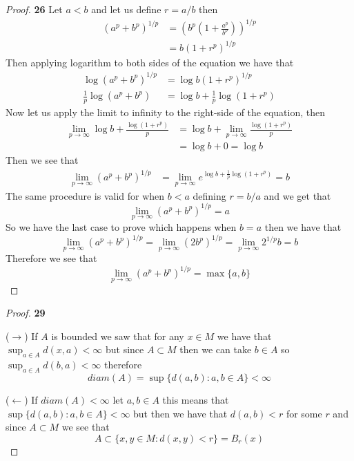 \documentclass[11pt]{article}
\theoremstyle{definition}
\begin{document}
    \begin{proof}{\textbf{26}}
        Let $a<b$ and let us define $r = a/b$ then
        \begin{align*}
            (a^p + b^p)^{1/p} &= \left(b^{p}(1 + \frac{a^p}{b^p})\right)^{1/p}\\
                &= b(1 + r^p)^{1/p}            
        \end{align*}
        Then applying logarithm to both sides of the equation we have that
        \begin{align*}
            \log(a^p + b^p)^{1/p} &= \log b(1 + r^p)^{1/p}\\
            \frac{1}{p}\log(a^p + b^p) &= \log b + \frac{1}{p}\log(1 + r^p)
        \end{align*}
        Now let us apply the limit to infinity to the right-side of the equation, then
        \begin{align*}
            \lim_{p \to \infty} \log b + \frac{\log(1 + r^p)}{p}
            &= \log b +  \lim_{p \to \infty} \frac{\log(1 + r^p)}{p}\\
            &= \log b + 0 = \log b
        \end{align*}
        Then we see that
        \begin{align*}
            \lim_{p \to \infty} (a^p + b^p)^{1/p} &= 
            \lim_{p \to \infty} e^{\log b + \frac{1}{p}\log(1 + r^p)} = b
        \end{align*}
        The same procedure is valid for when $b<a$ defining $r = b/a$ and we get that
        $$\lim_{p \to \infty} (a^p + b^p)^{1/p} = a$$
        So we have the last case to prove which happens when $b=a$ then we have that
        $$\lim_{p \to \infty} (a^p + b^p)^{1/p} = \lim_{p \to \infty} (2b^p)^{1/p}
        = \lim_{p \to \infty}2^{1/p}b = b$$
        Therefore we see that
        $$\lim_{p \to \infty} (a^p + b^p)^{1/p} = \max\{a,b\}$$ 
    \end{proof}
    \begin{proof}{\textbf{29}}

        ($\rightarrow$) If $A$ is bounded we saw that for any $x \in M$ we have that\\
        $\sup_{a \in A} d(x,a) < \infty$ but since $A \subset M$ then we can take
        $b \in A$ so\\ $\sup_{a \in A} d(b,a) < \infty$ therefore
        $$diam(A) = \sup\{d(a,b): a,b \in A\} < \infty$$

        ($\leftarrow$) If $diam(A) < \infty$ let $a,b \in A$ this means that
        $\sup\{d(a,b): a,b \in A\} < \infty$ but then we have that $d(a,b) < r$ for
        some $r$ and since $A \subset M$ we see that
        $$A \subset \{x,y \in M: d(x,y)<r\} = B_r(x)$$
    \end{proof}
\end{document}
